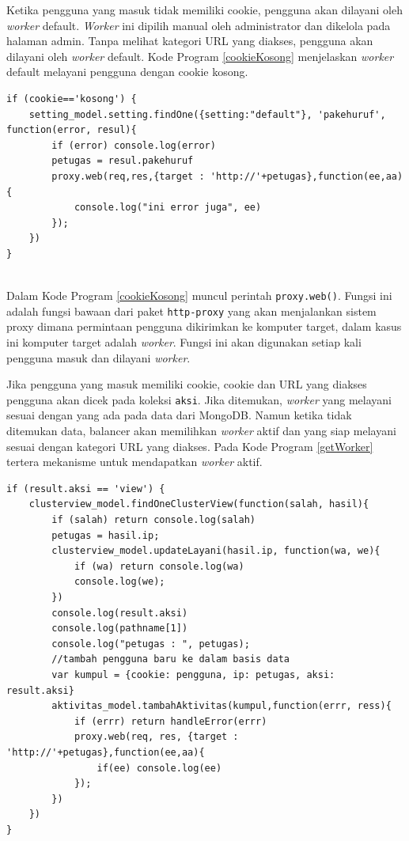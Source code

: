 \documentclass{ta-its}
\begin{document}
				Ketika pengguna yang masuk tidak memiliki cookie, pengguna akan dilayani oleh \textit{worker} default. \textit{Worker} ini dipilih manual oleh administrator dan dikelola pada halaman admin. Tanpa melihat kategori URL yang diakses, pengguna akan dilayani oleh \textit{worker} default. Kode Program \ref{cookieKosong} menjelaskan \textit{worker} default melayani pengguna dengan cookie kosong. 
				
				\begin{lstlisting}[frame=single,tabsize=2,breaklines,caption={Worker Default Melayani Cookie Kosong},label=cookieKosong]
if (cookie=='kosong') {
	setting_model.setting.findOne({setting:"default"}, 'pakehuruf', function(error, resul){
		if (error) console.log(error)				
		petugas = resul.pakehuruf
		proxy.web(req,res,{target : 'http://'+petugas},function(ee,aa){
			console.log("ini error juga", ee)
		});
	})
}
				
				\end{lstlisting}
				
				Dalam Kode Program \ref{cookieKosong} muncul perintah \texttt{proxy.web()}. Fungsi ini adalah fungsi bawaan dari paket \texttt{http-proxy} yang akan menjalankan sistem proxy dimana permintaan pengguna dikirimkan ke komputer target, dalam kasus ini komputer target adalah \textit{worker}. Fungsi ini akan digunakan setiap kali pengguna masuk dan dilayani \textit{worker}.
				
				Jika pengguna yang masuk memiliki cookie, cookie dan URL yang diakses pengguna akan dicek pada koleksi \texttt{aksi}. Jika ditemukan, \textit{worker} yang melayani sesuai dengan yang ada pada data dari MongoDB. Namun ketika tidak ditemukan data, balancer akan memilihkan \textit{worker} aktif dan yang siap melayani sesuai dengan kategori URL yang diakses. Pada Kode Program \ref{getWorker} tertera mekanisme untuk mendapatkan \textit{worker} aktif.
				
				\begin{lstlisting}[frame=single,tabsize=2,breaklines,caption={Mekanisme Pencarian Worker Aktif},label=getWorker]
if (result.aksi == 'view') {
	clusterview_model.findOneClusterView(function(salah, hasil){
		if (salah) return console.log(salah)
		petugas = hasil.ip;
		clusterview_model.updateLayani(hasil.ip, function(wa, we){
			if (wa) return console.log(wa)
			console.log(we);
		})
		console.log(result.aksi)
		console.log(pathname[1])
		console.log("petugas : ", petugas);
		//tambah pengguna baru ke dalam basis data
		var kumpul = {cookie: pengguna, ip: petugas, aksi: result.aksi}
		aktivitas_model.tambahAktivitas(kumpul,function(errr, ress){
			if (errr) return handleError(errr)
			proxy.web(req, res, {target : 'http://'+petugas},function(ee,aa){
				if(ee) console.log(ee)
			});
		})
	})
}
				
				\end{lstlisting}
				
\end{document}

